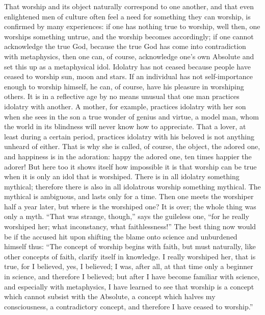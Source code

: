 \documentclass[12pt]{book}
\newcommand{\opage}[1]{\marginnote{\footnotesize\textit{[#1]}}}
\begin{document}
That worship and its object naturally correspond to one another, and
that even enlightened men of culture often feel a need for something
they can worship, is confirmed by many experiences: if one has nothing
true to worship, well then, one worships something untrue, and the
worship becomes
\opage{116}\setcounter{footnote}{0}%
accordingly; if one cannot acknowledge the true God, because the true
God has come into contradiction with metaphysics, then one can, of
course, acknowledge one's own Absolute and set this up as a metaphysical
idol. Idolatry has not ceased because people have ceased to worship sun,
moon and stars. If an individual has not self-importance enough to
worship himself, he can, of course, have his pleasure in worshiping
others. It is in a reflective age by no means unusual that one man
practices idolatry with another. A mother, for example, practices
idolatry with her son when she sees in the son a true wonder of genius
and virtue, a model man, whom the world in its blindness will never know
how to appreciate. That a lover, at least during a certain period,
practices idolatry with his beloved is not anything unheard of either.
That is why she is called, of course, the object, the adored one, and
happiness is in the adoration: happy the adored one, ten times happier
the adorer! But here too it shows itself how impossible it is that
worship can be true when it is only an idol that is worshiped. There is
in all idolatry something mythical; therefore there is also in all
idolatrous worship something mythical. The mythical is ambiguous, and
lasts only for a time. Then one meets the worshiper half a year later,
but where is the worshiped one? It is over; the whole thing was only a
myth. ``That was strange, though,'' says the guileless one, ``for he
really worshiped her; what inconstancy, what faithlessness!'' The best
thing now would be if the accused hit upon shifting the blame onto
science and unburdened himself thus: ``The concept of worship begins
with faith, but must naturally, like other concepts of faith, clarify
itself in knowledge. I really worshiped her, that is true, for I
believed, yes, I believed; I was, after all, at that time only a beginner
in science, and therefore I believed; but after I have
\opage{117}\setcounter{footnote}{0}%
become familiar with science, and especially with metaphysics, I have
learned to see that worship is a concept which cannot subsist with the
Absolute, a concept which halves my consciousness, a contradictory
concept, and therefore I have ceased to worship.''
\end{document}
